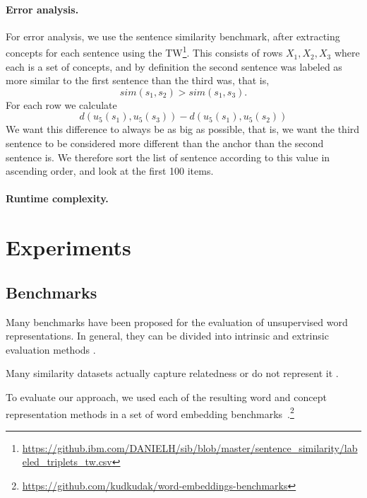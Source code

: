\documentclass{article}
\begin{document}
    \paragraph{Error analysis.}
    For error analysis, we use the sentence similarity benchmark,
    after extracting concepts for each sentence using the
    TW\footnote{\url{https://github.ibm.com/DANIELH/sib/blob/master/sentence_similarity/labeled_triplets_tw.csv}}.
    This consists of rows $X_1,X_2,X_3$ where each is a set of concepts,
    and by definition the second sentence was labeled as more similar to the first
    sentence than the third was, that is,
    \[
        sim(s_1,s_2)>sim(s_1,s_3).
    \]
    For each row we calculate
    \[
        d(u_5(s_1),u_5(s_3)) - d(u_5(s_1),u_5(s_2))
    \]
    We want this difference to always be as big as possible,
    that is, we want the third sentence to be considered more different than
    the anchor than the second sentence is.
    We therefore sort the list of sentence according to this value
    in ascending order, and look at the first 100 items.

    \paragraph{Runtime complexity.}



    \section{Experiments}\label{sec:experiments}
    
    \subsection{Benchmarks}\label{sec:benchmarks}

    Many benchmarks have been proposed for the evaluation of unsupervised word
    representations.
    In general, they can be divided into intrinsic and extrinsic evaluation methods \cite{schnabel2015evaluation,jastrzebski2017evaluate,alshargi2018concept2vec,bakarov2018survey,chiu2016intrinsic}.

    Many similarity datasets actually capture relatedness or do not represent it \cite{hill2015simlex,avraham2016improving}.

    To evaluate our approach, we used each of the resulting word and concept
    representation methods in a set of word embedding benchmarks~\cite{jastrzebski2017evaluate}.\footnote{\url{https://github.com/kudkudak/word-embeddings-benchmarks}}
    
\end{document}
